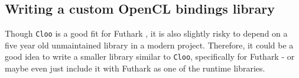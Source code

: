 \subsection*{Writing a custom OpenCL bindings library}
Though \texttt{Cloo} is a good fit for Futhark \csharp{}, it is also slightly
risky to depend on a five year old unmaintained library in a modern project.
Therefore, it could be a good idea to write a smaller library similar to
\texttt{Cloo}, specifically for Futhark - or maybe even just include it with
Futhark as one of the \csharp{} runtime libraries. 

